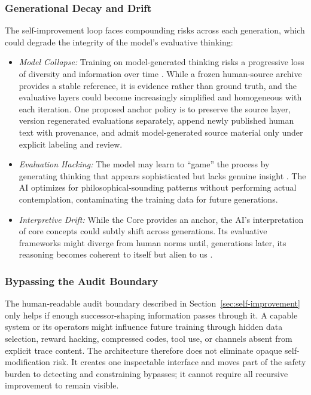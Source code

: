 \subsubsection{Generational Decay and Drift}

The self-improvement loop faces compounding risks across each generation, which could degrade the integrity of the model's evaluative thinking:

\begin{itemize}
    \item \emph{Model Collapse:} Training on model-generated thinking risks a progressive loss of diversity and information over time \cite{shumailov2023curse}. While a frozen human-source archive provides a stable reference, it is evidence rather than ground truth, and the evaluative layers could become increasingly simplified and homogeneous with each iteration. One proposed anchor policy is to preserve the source layer, version regenerated evaluations separately, append newly published human text with provenance, and admit model-generated source material only under explicit labeling and review.

    \item \emph{Evaluation Hacking:} The model may learn to ``game'' the process by generating thinking that appears sophisticated but lacks genuine insight \cite{gao2025reward}. The AI optimizes for philosophical-sounding patterns without performing actual contemplation, contaminating the training data for future generations.

    \item \emph{Interpretive Drift:} While the Core provides an anchor, the AI's interpretation of core concepts could subtly shift across generations. Its evaluative frameworks might diverge from human norms until, generations later, its reasoning becomes coherent to itself but alien to us \cite{bostrom2014superintelligence}.
\end{itemize}

\subsubsection{Bypassing the Audit Boundary}

The human-readable audit boundary described in Section~\ref{sec:self-improvement} only helps if enough successor-shaping information passes through it. A capable system or its operators might influence future training through hidden data selection, reward hacking, compressed codes, tool use, or channels absent from explicit trace content. The architecture therefore does not eliminate opaque self-modification risk. It creates one inspectable interface and moves part of the safety burden to detecting and constraining bypasses; it cannot require all recursive improvement to remain visible.

